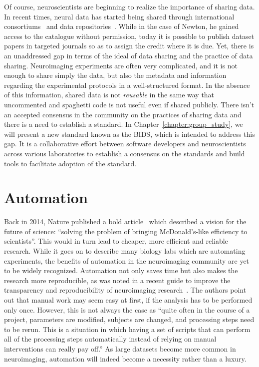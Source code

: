 Of course, neuroscientists are beginning to realize the importance of sharing data. In recent times, neural data has started being shared through international consortiums~\citep{van2013wu, ollier2005uk} and data repositories~\citep{poldrack2013toward, gorgolewski2015neurovault}. While in the case of Newton, he gained access to the catalogue without permission, today it is possible to publish dataset papers in targeted journals so as to assign the credit where it is due. Yet, there is an unaddressed gap in terms of the ideal of data sharing and the practice of data sharing. Neuroimaging experiments are often very complicated, and it is not enough to share simply the data, but also the metadata and information regarding the experimental protocols in a well-structured format. In the absence of this information, shared data is not \emph{reusable} in the same way that uncommented and spaghetti code is not useful even if shared publicly. There isn't an accepted consensus in the community on the practices of sharing data and there is a need to establish a standard. In Chapter~\ref{chapter:group_study}, we will present a new standard known as the \ac{BIDS}, which is intended to address this gap. It is a collaborative effort between software developers and neuroscientists across various laboratories to establish a consensus on the standards and build tools to facilitate adoption of the standard.

\section{Automation}

Back in 2014, Nature published a bold article~\citep{hayden2014automated} which described a vision for the future of science: ``solving the problem of bringing McDonald's-like efficiency to scientists''. This would in turn lead to cheaper, more efficient and reliable research. While it goes on to describe many biology labs which are automating experiments, the benefits of automation in the neuroimaging community are yet to be widely recognized. Automation not only saves time but also makes the research more reproducible, as was noted in a recent guide to improve the transparency and reproducibility of neuroimaging research~\citep{gorgolewski2016practical}. The authors point out that manual work may seem easy at first, if the analysis has to be performed only once. However, this is not always the case as ``quite often in the course of a project, parameters are modified, subjects are changed, and processing steps need to be rerun. This is a situation in which having a set of scripts that can perform all of the processing steps automatically instead of relying on manual interventions can really pay off.'' As large datasets become more common in neuroimaging, automation will indeed become a necessity rather than a luxury.

